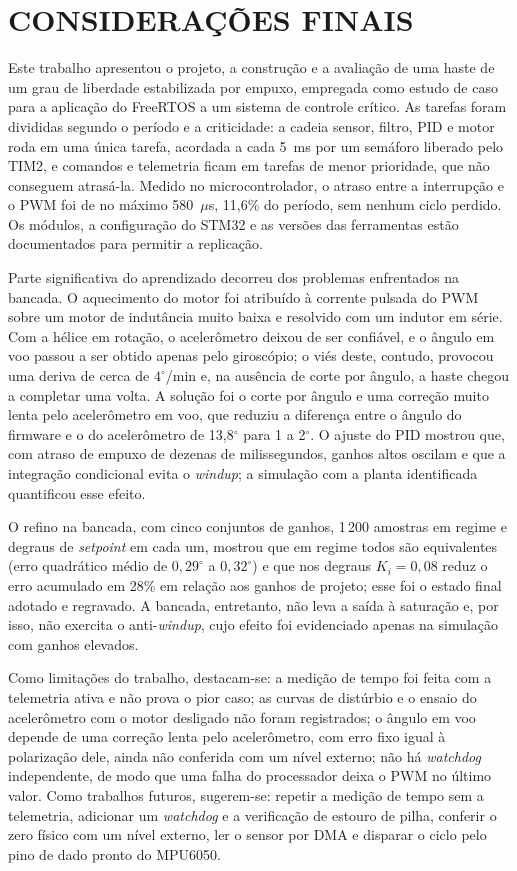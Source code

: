\chapter{CONSIDERAÇÕES FINAIS}
Este trabalho apresentou o projeto, a construção e a avaliação de uma haste de um grau de liberdade estabilizada por empuxo, empregada como estudo de caso para a aplicação do FreeRTOS a um sistema de controle crítico. As tarefas foram divididas segundo o período e a criticidade: a cadeia sensor, filtro, PID e motor roda em uma única tarefa, acordada a cada 5~ms por um semáforo liberado pelo TIM2, e comandos e telemetria ficam em tarefas de menor prioridade, que não conseguem atrasá-la. Medido no microcontrolador, o atraso entre a interrupção e o PWM foi de no máximo 580~$\mu$s, 11,6\% do período, sem nenhum ciclo perdido. Os módulos, a configuração do STM32 e as versões das ferramentas estão documentados para permitir a replicação.

Parte significativa do aprendizado decorreu dos problemas enfrentados na bancada. O aquecimento do motor foi atribuído à corrente pulsada do PWM sobre um motor de indutância muito baixa e resolvido com um indutor em série. Com a hélice em rotação, o acelerômetro deixou de ser confiável, e o ângulo em voo passou a ser obtido apenas pelo giroscópio; o viés deste, contudo, provocou uma deriva de cerca de $4^\circ$/min e, na ausência de corte por ângulo, a haste chegou a completar uma volta. A solução foi o corte por ângulo e uma correção muito lenta pelo acelerômetro em voo, que reduziu a diferença entre o ângulo do firmware e o do acelerômetro de 13,8$^\circ$ para 1 a 2$^\circ$. O ajuste do PID mostrou que, com atraso de empuxo de dezenas de milissegundos, ganhos altos oscilam e que a integração condicional evita o \textit{windup}; a simulação com a planta identificada quantificou esse efeito.

O refino na bancada, com cinco conjuntos de ganhos, 1\,200 amostras em regime e degraus de \textit{setpoint} em cada um, mostrou que em regime todos são equivalentes (erro quadrático médio de $0{,}29^\circ$ a $0{,}32^\circ$) e que nos degraus $K_i=0{,}08$ reduz o erro acumulado em 28\% em relação aos ganhos de projeto; esse foi o estado final adotado e regravado. A bancada, entretanto, não leva a saída à saturação e, por isso, não exercita o anti-\textit{windup}, cujo efeito foi evidenciado apenas na simulação com ganhos elevados.

Como limitações do trabalho, destacam-se: a medição de tempo foi feita com a telemetria ativa e não prova o pior caso; as curvas de distúrbio e o ensaio do acelerômetro com o motor desligado não foram registrados; o ângulo em voo depende de uma correção lenta pelo acelerômetro, com erro fixo igual à polarização dele, ainda não conferida com um nível externo; não há \textit{watchdog} independente, de modo que uma falha do processador deixa o PWM no último valor. Como trabalhos futuros, sugerem-se: repetir a medição de tempo sem a telemetria, adicionar um \textit{watchdog} e a verificação de estouro de pilha, conferir o zero físico com um nível externo, ler o sensor por DMA e disparar o ciclo pelo pino de dado pronto do MPU6050.
